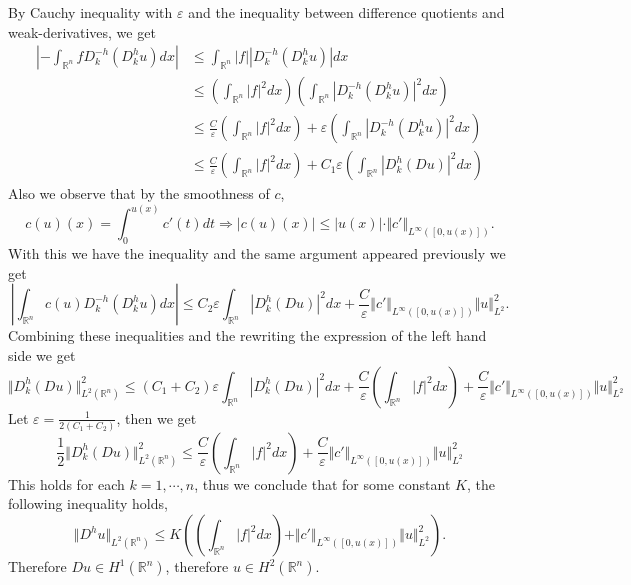 \documentclass{article}
\begin{document}
By Cauchy inequality with $\varepsilon$ and the inequality between difference quotients and weak-derivatives, we get
\begin{align*}
\left|-\int_{\mathbb{R}^n} fD_k^{-h}(D_k^h u)dx\right| & \leq \int_{\mathbb{R}^n} |f||D_k^{-h}(D_k^h u)|dx\\
&\leq(\int_{\mathbb{R}^n} |f|^2dx)(\int_{\mathbb{R}^n}|D_k^{-h}(D_k^h u)|^2dx)\\
& \leq {\frac C \varepsilon}(\int_{\mathbb{R}^n} |f|^2dx)+\varepsilon(\int_{\mathbb{R}^n}|D_k^{-h}(D_k^h u)|^2dx)\\
& \leq {\frac C \varepsilon}(\int_{\mathbb{R}^n} |f|^2dx)+C_1\varepsilon(\int_{\mathbb{R}^n}|D_k^{h}(Du)|^2dx)
\end{align*}
Also we observe that by the smoothness of $c$,
\begin{equation*}
c(u)(x) = \int_0^{u(x)}c'(t)dt \Rightarrow |c(u)(x)|\leq |u(x)|\cdot\Vert c'\Vert_{L^\infty([0,u(x)])}.
\end{equation*}
With this we have the inequality and the same argument appeared previously we get 
\begin{equation*}
|\int_{\mathbb{R}^n}c(u)D_k^{-h}(D_k^hu)dx|\leq C_2\varepsilon\int_{\mathbb{R}^n}|D_k^h(Du)|^2dx+{\frac C \varepsilon}\Vert c'\Vert_{L^\infty([0,u(x)])}\Vert u\Vert^2_{L^2}.
\end{equation*}
Combining these inequalities and the rewriting the expression of the left hand side we get
\begin{equation*}
\Vert D_k^h(Du)\Vert^2_{L^2(\mathbb{R}^n)}\leq (C_1+C_2)\varepsilon\int_{\mathbb{R}^n}|D_k^h(Du)|^2dx + {\frac C \varepsilon}(\int_{\mathbb{R}^n} |f|^2dx) +{\frac C \varepsilon}\Vert c'\Vert_{L^\infty([0,u(x)])}\Vert u\Vert^2_{L^2}
\end{equation*}
Let $\varepsilon = {\frac 1 {2(C_1+C_2)}}$, then we get
\begin{equation*}
{\frac 1 2}\Vert D_k^h(Du)\Vert^2_{L^2(\mathbb{R}^n)}\leq{\frac C \varepsilon}(\int_{\mathbb{R}^n} |f|^2dx) +{\frac C \varepsilon}\Vert c'\Vert_{L^\infty([0,u(x)])}\Vert u\Vert^2_{L^2}
\end{equation*}
This holds for each $k=1,\cdots,n$, thus we conclude that for some constant $K$, the following inequality holds,
\begin{equation*}
\Vert D^hu\Vert_{L^2(\mathbb{R}^n)}\leq K((\int_{\mathbb{R}^n} |f|^2dx) +\Vert c'\Vert_{L^\infty([0,u(x)])}\Vert u\Vert^2_{L^2}).
\end{equation*}
Therefore $Du\in H^1(\mathbb{R}^n)$, therefore $u\in H^2(\mathbb{R}^n)$. 
\end{document}
